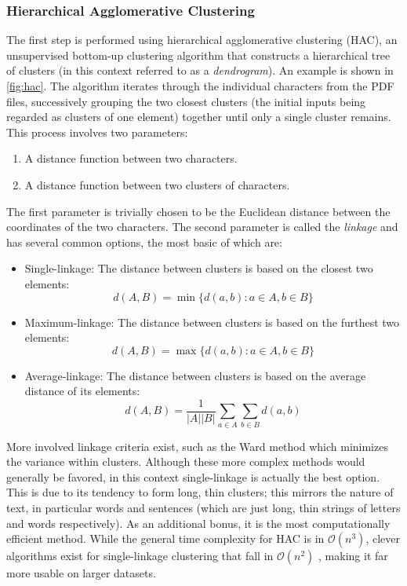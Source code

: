 \subsubsection{Hierarchical Agglomerative Clustering}
The first step is performed using hierarchical agglomerative clustering (HAC),
an unsupervised bottom-up clustering algorithm that constructs a hierarchical
tree of clusters (in this context referred to as a \emph{dendrogram}). An
example is shown in \cref{fig:hac}. The algorithm iterates through the individual
characters from the PDF files, successively grouping the two closest
clusters (the initial inputs being regarded as clusters of one element) together
until only a single cluster remains. This process involves two parameters:
\begin{enumerate}
\item A distance function between two characters.
\item A distance function between two clusters of characters.
\end{enumerate}
The first parameter is trivially chosen to be the Euclidean distance between the
coordinates of the two characters. The second parameter is called the
\emph{linkage} and has several common options, the most basic of which are:
\begin{itemize}
\item Single-linkage: The distance between clusters is based on the closest two
  elements: \[ d(A, B) = \min \{ d(a, b) : a \in A, b \in B \} \]
\item Maximum-linkage: The distance between clusters is based on the furthest two
  elements: \[ d(A, B) = \max \{ d(a, b) : a \in A, b \in B \} \]
\item Average-linkage: The distance between clusters is based on the average
  distance of its elements:
  \[ d(A, B) = \frac{1}{|A||B|} \sum_{a \in A}\sum_{b \in B} d(a, b) \]
\end{itemize}
More involved linkage criteria exist, such as the Ward method
which minimizes the variance within clusters. Although these more complex
methods would generally be favored, in this context single-linkage
is actually the best option\citep{klampfl2014unsupervised}. This is due
to its tendency to form long, thin clusters; this mirrors the nature of text, in
particular words and sentences (which are just long, thin strings of letters and
words respectively).
As an additional bonus, it is the most computationally efficient method.
While the general time complexity for HAC is
in $\mathcal{O}(n^3)$, clever algorithms exist for single-linkage clustering
that fall in $\mathcal{O}(n^2)$ \citep{sibson1973slink}, making it far more
usable on larger datasets.

